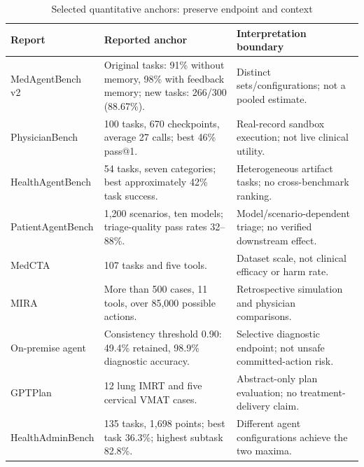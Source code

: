 \begin{table}[t]\caption{Selected quantitative anchors: preserve endpoint and context}\label{tab:anchors}\centering\footnotesize
\begin{tabularx}{\textwidth}{@{}p{}p{}Y@{}}\toprule
Report & Reported anchor & Interpretation boundary \\ \midrule
MedAgentBench v2 \cite{medagentbenchv2} & Original tasks: 91\% without memory, 98\% with feedback memory; new tasks: 266/300 (88.67\%). & Distinct sets/configurations; not a pooled estimate.\\
PhysicianBench \cite{physicianbench2026} & 100 tasks, 670 checkpoints, average 27 calls; best 46\% pass@1. & Real-record sandbox execution; not live clinical utility.\\
HealthAgentBench \cite{healthagentbench2026} & 54 tasks, seven categories; best approximately 42\% task success. & Heterogeneous artifact tasks; no cross-benchmark ranking.\\
PatientAgentBench \cite{patientagentbench2026} & 1,200 scenarios, ten models; triage-quality pass rates 32--88\%. & Model/scenario-dependent triage; no verified downstream effect.\\
MedCTA \cite{medcta2026} & 107 tasks and five tools. & Dataset scale, not clinical efficacy or harm rate.\\
MIRA \cite{mira2026} & More than 500 cases, 11 tools, over 85,000 possible actions. & Retrospective simulation and physician comparisons.\\
On-premise agent \cite{onprem2026} & Consistency threshold 0.90: 49.4\% retained, 98.9\% diagnostic accuracy. & Selective diagnostic endpoint; not unsafe committed-action risk.\\
GPTPlan \cite{gptplan2025} & 12 lung IMRT and five cervical VMAT cases. & Abstract-only plan evaluation; no treatment-delivery claim.\\
HealthAdminBench \cite{healthadmin2026} & 135 tasks, 1,698 points; best task 36.3\%; highest subtask 82.8\%. & Different agent configurations achieve the two maxima.\\ \bottomrule
\end{tabularx}\end{table}
